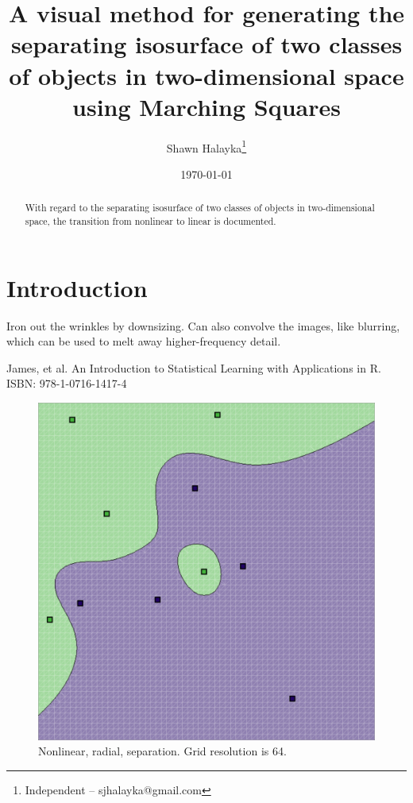 \documentclass[12pt]{article}
\title{A visual method for generating the separating isosurface of two classes of objects in two-dimensional space using Marching Squares}
\author{
Shawn Halayka\footnote{Independent -- sjhalayka@gmail.com}
}
\date{\today\;\currenttime}
\begin{document}
\maketitle

\begin{abstract}
With regard to the separating isosurface of two classes of objects in two-dimensional space, the transition from nonlinear to linear is documented.
\end{abstract}




\section{Introduction}

Iron out the wrinkles by downsizing.
Can also convolve the images, like blurring, which can be used to melt away higher-frequency detail.

\pagebreak





\begin{thebibliography}{9}

 James, et al. An Introduction to Statistical Learning with Applications in R. ISBN: 978-1-0716-1417-4

\end{thebibliography}





\pagebreak






\begin{figure} 
\centering
  \includegraphics[width = 3 in]{64_res.png}
  \caption{Nonlinear, radial, separation. Grid resolution is 64.
}
\end{figure}
\end{document}
